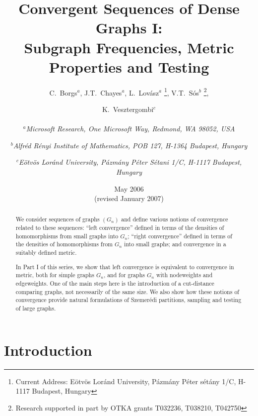 \documentclass[12pt]{article}
\date{May 2006\\(revised January 2007)}
\numberwithin{equation}{section}
\begin{document}
\title{Convergent Sequences of Dense Graphs I: \\
Subgraph Frequencies,
Metric Properties and Testing}

\author{C.~Borgs$^{a}$,\;
J.T.~Chayes$^a$,\;
L.~Lov\'asz$^a$%
\thanks{Current Address: E\"otv\"os Lor\'and University,
P\'azm\'any P\'eter s\'et\'any 1/C, H-1117 Budapest,
Hungary},\;
V.T.~S\'os$^b$%
\thanks{Research supported in part by OTKA grants T032236,
T038210, T042750},\;
\and
K.~Vesztergombi$^c$
\\
\\
$^a${\small\it Microsoft Research, One Microsoft Way, Redmond,
WA 98052, USA}
\vspace{-6pt}\and
$^b${\small\it Alfr\'ed R\'enyi Institute of Mathematics,
POB 127, H-1364 Budapest, Hungary}
\vspace{-5pt}\and
$^c${\small\it E\"otv\"os Lor\'and University,
P\'azm\'any P\'eter S\'etani 1/C, H-1117 Budapest,
Hungary}\\[5pt]}
\maketitle

\begin{abstract}

We consider sequences of graphs $(G_n)$ and define various notions of
convergence related to these sequences: ``left convergence'' defined
in terms of the densities of homomorphisms from small graphs into
$G_n$; ``right convergence'' defined in terms of the densities of
homomorphisms from $G_n$ into small graphs; and convergence in
a suitably defined metric.

In Part I of this series, we show that left convergence is equivalent
to convergence in metric, both for simple graphs $G_n$, and for
graphs $G_n$ with nodeweights and edgeweights.
One of the main steps here is the introduction of a cut-distance
comparing graphs, not necessarily of the same size.
We also
show how these notions of convergence provide natural formulations of
Szemer\'edi partitions, sampling and testing of large graphs.
\end{abstract}


\tableofcontents

\addtolength{\baselineskip}{3pt}
\section{Introduction}
\label{sec:intro}
\end{document}

